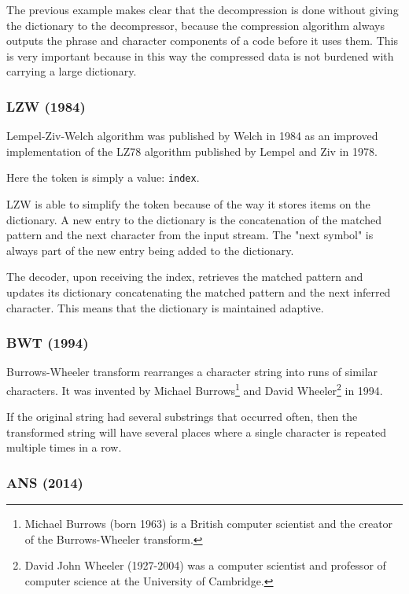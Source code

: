 \documentclass[12pt, a4paper]{report}
\begin{document}
The previous example makes clear that the decompression is done without giving the dictionary to the decompressor, because the
compression algorithm always outputs the phrase and character components of a code before it uses them.
This is very important because in this way the compressed data is not burdened with carrying a large dictionary.

\subsubsection{LZW (1984)}

Lempel-Ziv-Welch algorithm was published by Welch in 1984 as an improved implementation of the LZ78 algorithm published by Lempel
and Ziv in 1978.

Here the token is simply a value: \texttt{index}.

LZW is able to simplify the token because of the way it stores items on the dictionary.
A new entry to the dictionary is the concatenation of the matched pattern and the next character from the input stream.
The "next symbol" is always part of the new entry being added to the dictionary.

The decoder, upon receiving the index, retrieves the matched pattern and updates its dictionary concatenating the matched pattern
and the next inferred character. This means that the dictionary is maintained adaptive.

\subsubsection{BWT (1994)}

Burrows-Wheeler transform rearranges a character string into runs of similar characters.
It was invented by Michael Burrows\footnote{Michael Burrows (born 1963) is a British computer scientist and the creator of the
Burrows-Wheeler transform.} and David Wheeler\footnote{David John Wheeler (1927-2004) was a computer scientist and
professor of computer science at the University of Cambridge.} in 1994.

If the original string had several substrings that occurred often, then the transformed string will have several places where a
single character is repeated multiple times in a row.

\subsubsection{ANS (2014)}
\end{document}
